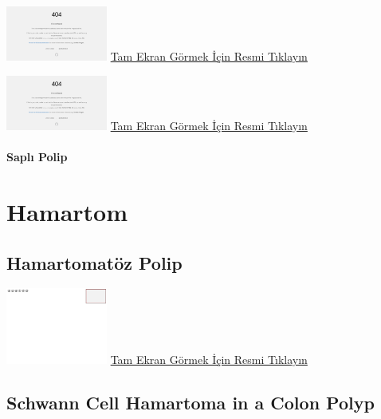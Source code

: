 \documentclass[
  letterpaper,
  DIV=11,
  numbers=noendperiod]{scrreprt}
\begin{document}
\href{https://images.patolojiatlasi.com/tubularadenoma-flat/HE.html}{\includegraphics[width=0.25\textwidth,height=\textheight]{./screenshots/tubularadenoma-flat1_screenshot.png}}
\href{https://images.patolojiatlasi.com/tubularadenoma-flat/HE.html}{Tam
Ekran Görmek İçin Resmi Tıklayın}

\href{https://images.patolojiatlasi.com/tubularadenoma-flat/HE2.html}{\includegraphics[width=0.25\textwidth,height=\textheight]{./screenshots/tubularadenoma-flat2_screenshot.png}}
\href{https://images.patolojiatlasi.com/tubularadenoma-flat/HE2.html}{Tam
Ekran Görmek İçin Resmi Tıklayın}

\hypertarget{sec-sapli-polip}{%
\subsubsection{Saplı Polip}\label{sec-sapli-polip}}

\hypertarget{sec-hamartom}{%
\chapter{Hamartom}\label{sec-hamartom}}

\hypertarget{sec-hamartomatoz-polip}{%
\section{Hamartomatöz Polip}\label{sec-hamartomatoz-polip}}

\href{https://images.patolojiatlasi.com/template/HE.html}{\includegraphics[width=0.25\textwidth,height=\textheight]{./screenshots/template_screenshot.png}}
\href{https://images.patolojiatlasi.com/hamartomatouspolyp/HE.html}{Tam
Ekran Görmek İçin Resmi Tıklayın}

\hypertarget{sec-schwann-cell-hamartoma-colon-polyp}{%
\section{Schwann Cell Hamartoma in a Colon
Polyp}\label{sec-schwann-cell-hamartoma-colon-polyp}}
\end{document}
